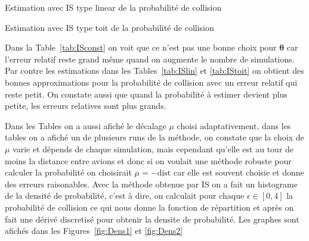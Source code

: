 \documentclass[a4paper, 12pt,twoside]{article}
\numberwithin{equation}{subsection}
\begin{document}
	\begin{table}[htbp]
		\begin{center}
		\end{center}
		\caption{Estimation avec IS type linear de la probabilité de collision}
		\label{tab:ISlin}
	\end{table}
	
	\begin{table}[htbp]
		\begin{center}
		\end{center}
		\caption{Estimation avec IS type toit de la probabilité de collision}
		\label{tab:IStoit}
	\end{table}
	
	Dans la Table~\ref{tab:ISconst} on voit que ce n'est pas une bonne choix pour $\boldsymbol \theta$ car l'erreur relatif reste grand même quand on augmente le nombre de simulations. Par contre les estimations dans les Tables~\ref{tab:ISlin} et \ref{tab:IStoit} on obtient des bonnes approximations pour la probabilité de collision avec un erreur relatif qui reste petit. On constate aussi que quand la probabilité à estimer devient plus petite, les erreurs relatives sont plus grands.
	
	Dans les Tables on a aussi afiché le décalage $\mu$ choisi adaptativement, dans les tables on a afiché un de plusieurs runs de la méthode, on constate que la choix de $\mu$ varie et dépends de chaque simulation, mais cependant qu'elle est au tour de moins la distance entre avions et donc si on voulait une méthode robuste pour calculer la probabilité on choisirait $\mu=-\mathrm{dist}$ car elle est souvent choisie et donne des erreurs raisonables.
	Avec la méthode obtenue par IS on a fait un histograme de la densité de probabilité, c'est à dire, on calculait pour chaque $\epsilon \in [0,4]$ la probabilité de collision ce qui nous donne la fonction de répartition et après on fait une dérivé discretisé pour obtenir la densite de probabilité. Les graphes sont afichés dans les Figures~\ref{fig:Dens1} et \ref{fig:Dens2}
	
\end{document}
